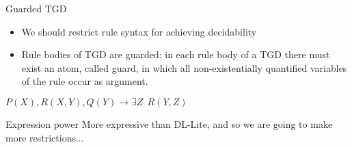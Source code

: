 \documentclass{beamer}
\begin{document}
 \begin{frame}{Guarded TGD}
 
 \begin{itemize}
 \item We should restrict rule syntax for achieving  decidability
 \item Rule bodies of TGD are guarded: in each rule body of a TGD there must exist an atom, called guard, in which all non-existentially quantified variables of the rule
 occur as argument.
 
 \end{itemize}
 
 \begin{center}
 $P(X), R(X,Y) , Q(Y) \rightarrow \exists Z~~ R(Y,Z)$
 \end{center}
 
 \begin{block}{Expression power}
 More expressive than DL-Lite, and so we are going to make more restrictions...
 \end{block}
 
 \end{frame}
\end{document}
